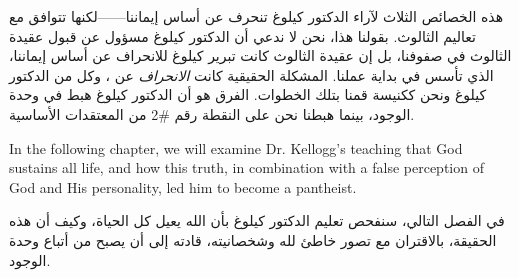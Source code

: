 هذه الخصائص الثلاث لآراء الدكتور كيلوغ تنحرف عن أساس إيماننا——لكنها تتوافق مع تعاليم الثالوث. بقولنا هذا، نحن لا ندعي أن الدكتور كيلوغ مسؤول عن قبول عقيدة الثالوث في صفوفنا، بل إن عقيدة الثالوث كانت تبرير كيلوغ للانحراف عن أساس إيماننا، الذي تأسس في بداية عملنا. المشكلة الحقيقية كانت \textit{الانحراف} عن ، وكل من الدكتور كيلوغ ونحن ككنيسة قمنا بتلك الخطوات. الفرق هو أن الدكتور كيلوغ هبط في وحدة الوجود، بينما هبطنا نحن على النقطة رقم \#2 من المعتقدات الأساسية.


In the following chapter, we will examine Dr. Kellogg's teaching that God sustains all life, and how this truth, in combination with a false perception of God and His personality, led him to become a pantheist.


في الفصل التالي، سنفحص تعليم الدكتور كيلوغ بأن الله يعيل كل الحياة، وكيف أن هذه الحقيقة، بالاقتران مع تصور خاطئ لله وشخصانيته، قادته إلى أن يصبح من أتباع وحدة الوجود.


